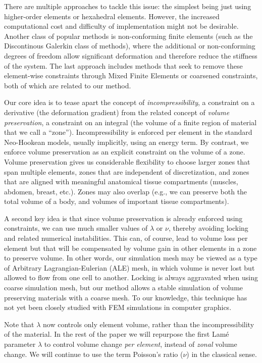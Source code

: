 There are multiple approaches to tackle this issue: the simplest being
just using higher-order elements or hexahedral elements. However, the
increased computational cost and difficulty of implementation might
not be desirable. Another class of popular methods is non-conforming
finite elements (such as the Discontinous Galerkin class of methods),
where the additional or non-conforming degrees of freedom allow
significant deformation and therefore reduce the stiffness of the
system.  The last approach includes methods that seek to remove these
element-wise constraints through Mixed Finite Elements or coarsened
constraints, both of which are related to our method.

Our core idea is to tease apart the concept of {\em
	incompressibility}, a constraint on a derivative (the deformation
gradient) from the related concept of {\em volume preservation}, a
constraint on an integral (the volume of a finite region of material
that we call a ``zone''). Incompressibility is enforced per element in
the standard Neo-Hookean models, usually implicitly, using an energy
term. By contrast, we enforce volume preservation as an explicit
constraint on the volume of a zone. Volume preservation gives us
considerable flexibility to choose larger zones that span multiple
elements, zones that are independent of discretization, and zones that
are aligned with meaningful anatomical tissue compartments (muscles,
abdomen, breast, etc.). Zones may also overlap (e.g., we can preserve
both the total volume of a body, and volumes of important tissue
compartments).

A second key idea is that since volume preservation is already
enforced using constraints, we can use much smaller values of
$\lambda$ or $\nu$, thereby avoiding locking and related numerical
instabilities. This can, of course, lead to volume loss per element
but that will be compensated by volume gain in other elements in a
zone to preserve volume. In other words, our simulation mesh may be
viewed as a type of Arbitrary Lagrangian-Eulerian (ALE) mesh, in which
volume is never lost but allowed to flow from one cell to another. 
Locking is always aggravated when using coarse simulation mesh, but our
method allows a stable simulation of volume preserving materials
with a coarse mesh.
To our knowledge, this technique has not yet been closely studied with
FEM simulations in computer graphics.

Note that $\lambda$ now controls only element volume, rather than the
incompressibility of the material. In the rest of the paper we will
repurpose the first Lam\'e parameter $\lambda$ to control volume
change \emph{per element}, instead of \emph{zonal} volume change.
We will continue to use the term Poisson's ratio ($\nu$) in the
classical sense.

